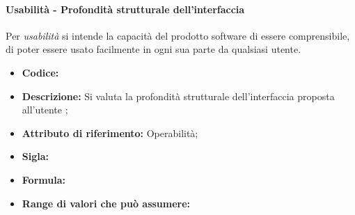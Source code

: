 \paragraph{Usabilità - Profondità strutturale dell'interfaccia}
Per \textit{usabilità} si intende la capacità del prodotto software di essere comprensibile, di poter essere usato facilmente in ogni sua parte da qualsiasi utente.

\begin{itemize}
    \item \textbf{Codice:} 
    \item \textbf{Descrizione:} Si valuta la profondità strutturale dell'interfaccia proposta all'utente ;
    \item \textbf{Attributo di riferimento:} Operabilità;
    \item \textbf{Sigla:}
    \item \textbf{Formula:}
    \item \textbf{Range di valori che può assumere:}
\end{itemize}